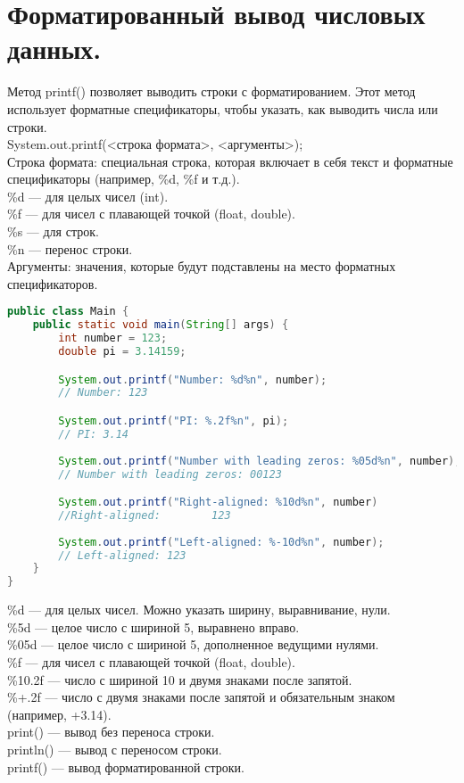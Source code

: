 \section{Форматированный вывод числовых данных.}
Метод printf() позволяет выводить строки с форматированием. Этот метод использует форматные спецификаторы, чтобы указать, как выводить числа или строки. \\
System.out.printf(<строка формата>, <аргументы>); \\
Строка формата: специальная строка, которая включает в себя текст и форматные спецификаторы (например, \%d, \%f и т.д.). \\
\%d — для целых чисел (int). \\
\%f — для чисел с плавающей точкой (float, double). \\
\%s — для строк. \\
\%n — перенос строки. \\
Аргументы: значения, которые будут подставлены на место форматных спецификаторов. \\
\begin{lstlisting}[language=Java]
public class Main {
    public static void main(String[] args) {
        int number = 123;
        double pi = 3.14159;

        System.out.printf("Number: %d%n", number);  
        // Number: 123

        System.out.printf("PI: %.2f%n", pi);  
        // PI: 3.14
        
        System.out.printf("Number with leading zeros: %05d%n", number);  
        // Number with leading zeros: 00123

        System.out.printf("Right-aligned: %10d%n", number) 
        //Right-aligned:        123
        
        System.out.printf("Left-aligned: %-10d%n", number);
        // Left-aligned: 123       
    }
}
\end{lstlisting}
\%d — для целых чисел. Можно указать ширину, выравнивание, нули. \\
\%5d — целое число с шириной 5, выравнено вправо. \\
\%05d — целое число с шириной 5, дополненное ведущими нулями. \\
\%f — для чисел с плавающей точкой (float, double). \\
\%10.2f — число с шириной 10 и двумя знаками после запятой. \\
\%+.2f — число с двумя знаками после запятой и обязательным знаком (например, +3.14).  \\
print() — вывод без переноса строки. \\
println() — вывод с переносом строки. \\
printf() — вывод форматированной строки.
